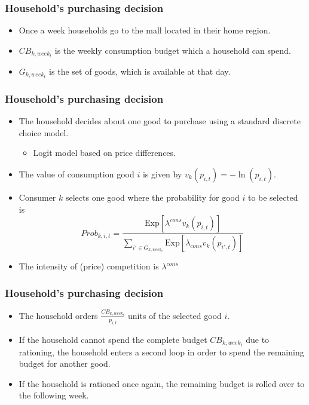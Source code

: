 \documentclass{beamer}
\begin{document}
\frame
{

  \frametitle{Household's purchasing decision} 
\begin{itemize}

\item Once a week households go to the  mall located in their home region.

\item $CB_{k,week_t}$ is the weekly consumption budget which a household can spend. 

\item $G_{k,week_t}$ is the set of goods, which is available at that day.


\end{itemize}

  
}



\frame
{

 \frametitle{Household's purchasing decision} 
\begin{itemize}
	\item The household decides about one good to purchase using a standard discrete choice model.
	
\begin{itemize}
	\item  Logit model based on price differences.
\end{itemize}
	\item The value of consumption good $i$ is given by $v_k(p_{i,t})=-\ln(p_{i,t}).$
	\item Consumer $k$ selects one good where the probability for good $i$ to be selected is
	\[
	Prob_{k,i,t} = \frac{\mbox{Exp}[\lambda^{cons}
v_{k}(p_{i,t})]}{\sum_{i' \in G_{k,week_t}}
\mbox{Exp}[\lambda_{cons} v_{k}(p_{i',t})]}
	\]
	\item The intensity of (price) competition is $\lambda^{cons}$


\end{itemize}


}
\frame
{

  \frametitle{Household's purchasing decision} 
\begin{itemize}

\item The household orders $\frac{CB_{k,week_t}}{p_{i,t}}$ units of the selected good $i$.
\item If the household cannot spend the complete budget $CB_{k,week_t}$
due to rationing, the household enters a second loop in
order to spend the remaining budget for another good.
\item If the household is rationed once again, the remaining budget
is rolled over to the following week.

\end{itemize}
 
  
}
\end{document}
